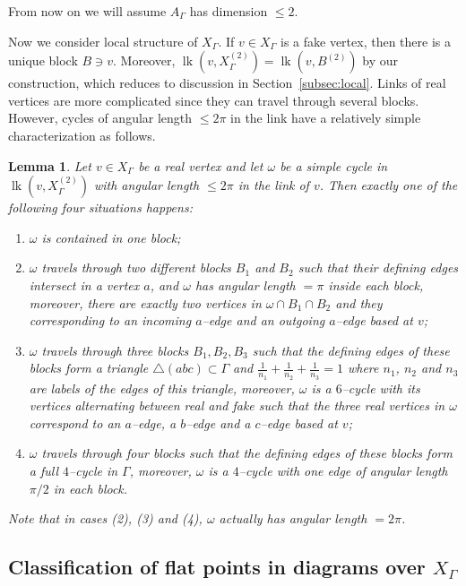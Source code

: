 \documentclass[11pt]{amsart}
\newcommand{\lk}{\operatorname{lk}}
\newtheorem{lemma}[theorem]{Lemma}
\theoremstyle{definition}
\newcommand{\lemsixsix}{Lemma 6.7}
\begin{document}
From now on we will assume $A_\Gamma$ has dimension $\le 2$.

Now we consider local structure of $X_\Gamma$. If $v\in X_\Gamma$ is a fake vertex, then there is a unique block $B\ni v$. Moreover, $\lk(v,X^{(2)}_\Gamma)=\lk(v,B^{(2)})$ by our construction, which reduces to discussion in Section~\ref{subsec:local}. Links of real vertices are more complicated since they can travel through several blocks. However, cycles of angular length $\le 2\pi$ in the link have a relatively simple characterization as follows.

\begin{lemma}\cite[\lemsixsix]{Artinmetric}
	\label{lem:2pi cycle}
	Let $v\in X_\Gamma$ be a real vertex and let $\omega$ be a simple cycle in $\lk(v,X^{(2)}_\Gamma)$ with angular length $\le 2\pi$ in the link of $v$. Then exactly one of the following four situations happens:
	\begin{enumerate}
		\item $\omega$ is contained in one block;
		\item $\omega$ travels through two different blocks $B_1$ and $B_2$ such that their defining edges intersect in a vertex $a$, and $\omega$ has angular length $=\pi$ inside each block, moreover, there are exactly two vertices in $\omega\cap B_1\cap B_2$ and they corresponding to an incoming $a$--edge and an outgoing $a$--edge based at $v$;
		\item $\omega$ travels through three blocks $B_1,B_2,B_3$ such that the defining edges of these blocks form a triangle $\triangle(abc)\subset \Gamma$ and $\frac{1}{n_1}+\frac{1}{n_2}+\frac{1}{n_3}=1$ where $n_1$, $n_2$ and $n_3$ are labels of the edges of this triangle, moreover, $\omega$ is a $6$--cycle with its vertices alternating between real and fake such that the three real vertices in $\omega$ correspond to an $a$--edge, a $b$--edge and a $c$--edge based at $v$;
		\item $\omega$ travels through four blocks such that the defining edges of these blocks form a full $4$--cycle in $\Gamma$, moreover, $\omega$ is a $4$--cycle with one edge of angular length $\pi/2$ in each block.
	\end{enumerate}
	Note that in cases (2), (3) and (4), $\omega$ actually has angular length $=2\pi$.
\end{lemma}
\subsection{Classification of flat points in diagrams over $X_\Gamma$}
\label{subsec:local structure}
\end{document}
